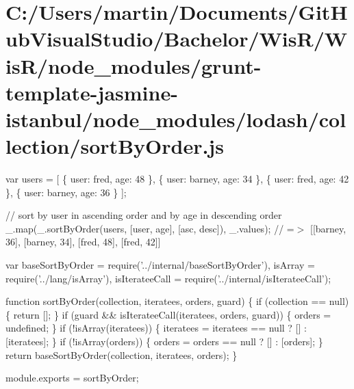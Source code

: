 \hypertarget{_c_1_2_users_2martin_2_documents_2_git_hub_visual_studio_2_bachelor_2_wis_r_2_wis_r_2node_module73bd2870c7524a5f30a3608eae61e65d}{}\section{C\+:/\+Users/martin/\+Documents/\+Git\+Hub\+Visual\+Studio/\+Bachelor/\+Wis\+R/\+Wis\+R/node\+\_\+modules/grunt-\/template-\/jasmine-\/istanbul/node\+\_\+modules/lodash/collection/sort\+By\+Order.\+js}
var users = \mbox{[} \{ \textquotesingle{}user\textquotesingle{}\+: \textquotesingle{}fred\textquotesingle{}, \textquotesingle{}age\textquotesingle{}\+: 48 \}, \{ \textquotesingle{}user\textquotesingle{}\+: \textquotesingle{}barney\textquotesingle{}, \textquotesingle{}age\textquotesingle{}\+: 34 \}, \{ \textquotesingle{}user\textquotesingle{}\+: \textquotesingle{}fred\textquotesingle{}, \textquotesingle{}age\textquotesingle{}\+: 42 \}, \{ \textquotesingle{}user\textquotesingle{}\+: \textquotesingle{}barney\textquotesingle{}, \textquotesingle{}age\textquotesingle{}\+: 36 \} \mbox{]};

// sort by {\ttfamily user} in ascending order and by {\ttfamily age} in descending order \+\_\+.\+map(\+\_\+.\+sort\+By\+Order(users, \mbox{[}\textquotesingle{}user\textquotesingle{}, \textquotesingle{}age\textquotesingle{}\mbox{]}, \mbox{[}\textquotesingle{}asc\textquotesingle{}, \textquotesingle{}desc\textquotesingle{}\mbox{]}), \+\_\+.\+values); // =$>$ \mbox{[}\mbox{[}\textquotesingle{}barney\textquotesingle{}, 36\mbox{]}, \mbox{[}\textquotesingle{}barney\textquotesingle{}, 34\mbox{]}, \mbox{[}\textquotesingle{}fred\textquotesingle{}, 48\mbox{]}, \mbox{[}\textquotesingle{}fred\textquotesingle{}, 42\mbox{]}\mbox{]}


\begin{DoxyCodeInclude}
var baseSortByOrder = require(\textcolor{stringliteral}{'../internal/baseSortByOrder'}),
    isArray = require(\textcolor{stringliteral}{'../lang/isArray'}),
    isIterateeCall = require(\textcolor{stringliteral}{'../internal/isIterateeCall'});

\textcolor{keyword}{function} sortByOrder(collection, iteratees, orders, guard) \{
  \textcolor{keywordflow}{if} (collection == null) \{
    \textcolor{keywordflow}{return} [];
  \}
  \textcolor{keywordflow}{if} (guard && isIterateeCall(iteratees, orders, guard)) \{
    orders = undefined;
  \}
  \textcolor{keywordflow}{if} (!isArray(iteratees)) \{
    iteratees = iteratees == null ? [] : [iteratees];
  \}
  \textcolor{keywordflow}{if} (!isArray(orders)) \{
    orders = orders == null ? [] : [orders];
  \}
  \textcolor{keywordflow}{return} baseSortByOrder(collection, iteratees, orders);
\}

module.exports = sortByOrder;
\end{DoxyCodeInclude}
 